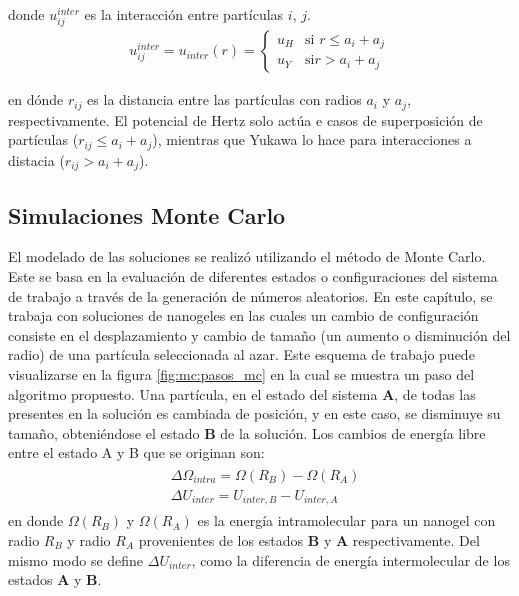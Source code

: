 	\noindent donde $u_{ij}^{inter}$ es la interacci\'on entre part\'iculas $i$, $j$.
	\begin{align}
	u_{ij}^{inter}	= u_{inter}(r) = \begin{cases} u_H  & \text{si } r \leq a_i + a_j \\ u_Y & \text{si} r > a_i + a_j \end{cases} 
		\label{eq:mc:HY-potential}
	\end{align}
	
	\noindent en d\'onde $r_{ij}$ es la distancia entre las part\'iculas con radios $a_i$ y $a_j$, respectivamente.
	El potencial de Hertz solo act\'ua e casos de superposici\'on de part\'iculas ($r_{ij} \leq a_i +a_j$), mientras que Yukawa lo hace para interacciones a distacia ($r_{ij} > a_i + a_j$).
	

	
	
	\subsection{Simulaciones Monte Carlo} \label{sec:mc:mc}
	
	El modelado de las soluciones se realiz\'o utilizando el m\'etodo de Monte Carlo. Este se basa en la evaluaci\'on de diferentes estados o configuraciones del sistema de trabajo a trav\'es de la generaci\'on de n\'umeros aleatorios. En este cap\'itulo, se trabaja con soluciones de nanogeles en las cuales un cambio de configuraci\'on consiste en el desplazamiento y cambio de tama\~no (un aumento o disminuci\'on  del radio) de una part\'icula seleccionada al azar. Este esquema de trabajo puede visualizarse en la figura \ref{fig:mc:pasos_mc} en la cual se muestra un paso del algoritmo propuesto. Una part\'icula, en el estado del sistema \textbf{A}, de todas las presentes en la soluci\'on es cambiada de posici\'on, y en este caso, se disminuye su tama\~no, obteni\'endose el estado \textbf{B} de la soluci\'on.
	Los cambios de energ\'ia libre entre el estado A y B que se originan son:
		\begin{align}
		\begin{aligned}
			& \Delta \Omega_{intra} = \Omega(R_B) - \Omega(R_A) \\
			& \Delta U_{inter} = U_{inter,B} - U_{inter,A}
		\end{aligned}
	\end{align}
	\noindent en donde $\Omega(R_B)$ y $\Omega(R_A)$ es la energ\'ia intramolecular para un nanogel con radio $R_B$ y radio $R_A$ provenientes de los estados \textbf{B} y \textbf{A} respectivamente. Del mismo modo se define $\Delta U_{inter}$, como la diferencia de energ\'ia intermolecular de los estados \textbf{A} y \textbf{B}.
	

